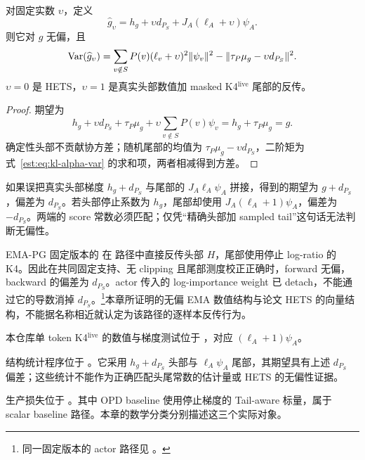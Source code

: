 \begin{theorem}
对固定实数 $\upsilon$，定义
\begin{equation*}
 \widehat g_\upsilon
 =h_g+\upsilon d_{P_S}+J_A(\ell_A+\upsilon)\psi_A.
\end{equation*}
则它对 $g$ 无偏，且
\begin{equation}
 \operatorname{Var}(\widehat g_\upsilon)
 =\sum_{v\notin S}P(v)(\ell_v+\upsilon)^2\lVert \psi_v\rVert^2
  -\lVert\tau_P\mu_g-\upsilon d_{P_S}\rVert^2.
 \label{est:eq:kl-alpha-var}
\end{equation}
$\upsilon=0$ 是 HETS，$\upsilon=1$ 是真实头部数值加 masked K4$^{\mathrm{live}}$ 尾部的反传。
\end{theorem}

\begin{proof}
期望为
\begin{equation*}
 h_g+\upsilon d_{P_S}+\tau_P\mu_g+\upsilon\sum_{v\notin S}P(v)\psi_v
 =h_g+\tau_P\mu_g=g.
\end{equation*}
确定性头部不贡献协方差；随机尾部的均值为 $\tau_P\mu_g-\upsilon d_{P_S}$，二阶矩为式~\eqref{est:eq:kl-alpha-var} 的求和项，两者相减得到方差。
\end{proof}

如果误把真实头部梯度 $h_g+d_{P_S}$ 与尾部的 $J_A\ell_A\psi_A$ 拼接，得到的期望为 $g+d_{P_S}$，偏差为 $d_{P_S}$。若头部停止系数为 $h_g$，尾部却使用 $J_A(\ell_A+1)\psi_A$，偏差为 $-d_{P_S}$。两端的 score 常数必须匹配；仅凭“精确头部加 sampled tail”这句话无法判断无偏性。

EMA-PG 固定版本的  在  路径中直接反传头部 $H$，尾部使用停止 log-ratio 的 K4。因此在共同固定支持、无 clipping 且尾部测度校正正确时，forward 无偏，backward 的偏差为 $d_{P_S}$。actor 传入的 log-importance weight 已 detach，不能通过它的导数消掉 $d_{P_S}$。\footnote{同一固定版本的 actor 路径见 \href{https://github.com/LunjunZhang/ema-pg/blob/f9b977632ad948ce935432a517c22291bfaba562/search/verl/workers/actor/dp_actor.py}{}。}本章所证明的无偏 EMA 数值结构与论文 HETS 的向量结构，不能据名称相近就认定为该路径的逐样本反传行为。

本仓库单 token K4$^{\mathrm{live}}$ 的数值与梯度测试位于 ，对应 $(\ell_A+1)\psi_A$。

结构统计程序位于 。它采用 $h_g+d_{P_S}$ 头部与 $\ell_A\psi_A$ 尾部，其期望具有上述 $d_{P_S}$ 偏差；这些统计不能作为正确匹配头尾常数的估计量或 HETS 的无偏性证据。

生产损失位于 。其中 OPD baseline 使用停止梯度的 Tail-aware 标量，属于 scalar baseline 路径。本章的数学分类分别描述这三个实际对象。
